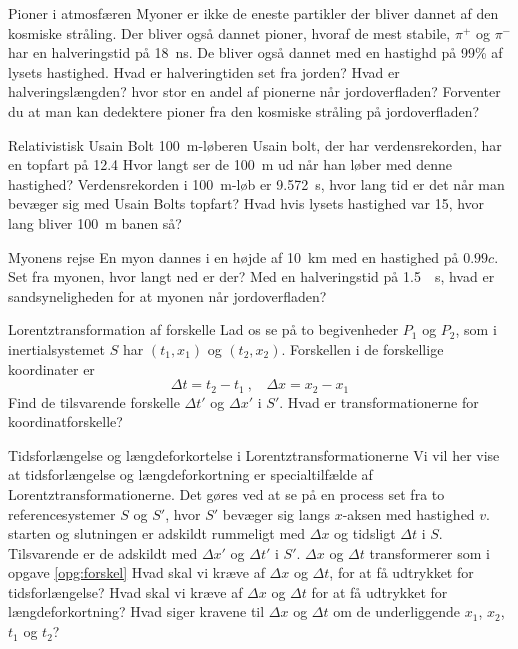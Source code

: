 \begin{opgave}{Pioner i atmosfæren}
Myoner er ikke de eneste partikler der bliver dannet af den kosmiske stråling.
Der bliver også dannet pioner, hvoraf de mest stabile, $\pi^+$ og $\pi^-$ har en halveringstid på \SI{18}{ns}.
De bliver også dannet med en hastighd på 99\% af lysets hastighed.
\opg Hvad er halveringtiden set fra jorden?
\opg Hvad er halveringslængden?
\opg hvor stor en andel af pionerne når jordoverfladen?
\opg Forventer du at man kan dedektere pioner fra den kosmiske stråling på jordoverfladen?
\end{opgave}

\begin{opgave}{Relativistisk Usain Bolt}
\SI{100}{m}-løberen Usain bolt, der har verdensrekorden, har en topfart på \SI{12,4}{}
\opg Hvor langt ser de \SI{100}{m} ud når han løber med denne hastighed?
\opg Verdensrekorden i \SI{100}{m}-løb er \SI{9,572}{s}, hvor lang tid er det når man bevæger sig med Usain Bolts topfart?
\opg Hvad hvis lysets hastighed var \SI{15}{}, hvor lang bliver \SI{100}{m} banen så?
\end{opgave}

\begin{opgave}{Myonens rejse}
En myon dannes i en højde af \SI{10}{km} med en hastighed på $0.99 c$.
\opg Set fra myonen, hvor langt ned er der?
\opg Med en halveringstid på \SI{1.5}{\mu s}, hvad er sandsyneligheden for at myonen når jordoverfladen?
\end{opgave}



\begin{opgave}{Lorentztransformation af forskelle}\label{opg:forskel}
Lad os se på to begivenheder $P_1$ og $P_2$, som i inertialsystemet $S$ har $(t_1,x_1)$  og $(t_2,x_2)$. Forskellen i de forskellige koordinater er
$$
\Delta t=t_2-t_1 \: ,~~~~\Delta x=x_2-x_1
$$\opg Find de tilsvarende forskelle $\Delta t'$ og $\Delta x'$ i $S'$.
\opg Hvad er transformationerne for koordinatforskelle?
\end{opgave}

\begin{opgave}{Tidsforlængelse og længdeforkortelse i Lorentztransformationerne}
Vi vil her vise at tidsforlængelse og længdeforkortning er specialtilfælde af Lorentztransformationerne.
Det gøres ved at se på en process set fra to referencesystemer $S$ og $S'$, hvor $S'$ bevæger sig langs $x$-aksen med hastighed $v$. starten og slutningen er adskildt rummeligt med $\Delta x$ og tidsligt $\Delta t $  i $S$. Tilsvarende er de adskildt med $\Delta x'$ og $\Delta t'$ i $S'$.
$\Delta x$ og $\Delta t$ transformerer som i opgave \ref{opg:forskel}
\opg Hvad skal vi kræve af $\Delta x$ og $\Delta t$, for at få udtrykket for tidsforlængelse?
\opg Hvad skal vi kræve af $\Delta x$ og $\Delta t$ for at få udtrykket for længdeforkortning?
\opg Hvad siger kravene til $\Delta x$ og $\Delta t$ om de underliggende $x_1$, $x_2$, $t_1$ og $t_2$?
\end{opgave}



